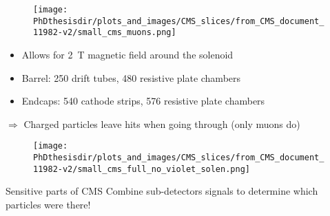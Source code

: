 \begin{frame}
\addtocounter{framenumber}{-1}
\begin{minipage}[t]{.6\textwidth}
\begin{figure}
\texttt{[image: \\PhDthesisdir/plots\_and\_images/CMS\_slices/from\_CMS\_document\_11982-v2/small\_cms\_muons.png]}
\end{figure}
\end{minipage}
\hfill\begin{minipage}[t]{.35\textwidth}
\begin{block}{}
\begin{itemize}
\item Allows for \SI{2}{\tesla} magnetic field around the solenoid
\end{itemize}
\end{block}

\begin{block}{}
\begin{itemize}
\item Barrel: \num{250} drift tubes, \num{480} resistive plate chambers
\item Endcaps: \num{540} cathode strips, \num{576} resistive plate chambers
\end{itemize}
\end{block}

\begin{block}{}
$\Rightarrow$ Charged particles leave hits when going through (only muons do)
\end{block}
\vspace{-2\baselineskip}
\end{minipage}

\end{frame}

\begin{frame}
\addtocounter{framenumber}{-1}
\begin{minipage}[t]{.6\textwidth}
\begin{figure}
\texttt{[image: \\PhDthesisdir/plots\_and\_images/CMS\_slices/from\_CMS\_document\_11982-v2/small\_cms\_full\_no\_violet\_solen.png]}
\end{figure}
\end{minipage}
\hfill\begin{minipage}[t]{.35\textwidth}
\begin{block}{Sensitive parts of CMS}
Combine sub-detectors signals to determine which particles were there!
\end{block}
\end{minipage}
\end{frame}